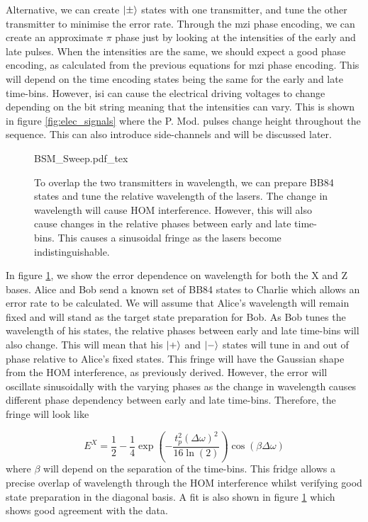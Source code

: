 Alternative, we can create $\ket{\pm}$ states with one transmitter, and tune the other transmitter to minimise the error rate. Through the \ac{mzi} phase encoding, we can create an approximate $\pi$ phase just by looking at the intensities of the early and late pulses. When the intensities are the same, we should expect a good phase encoding, as calculated from the previous equations for \ac{mzi} phase encoding. This will depend on the time encoding states being the same for the early and late time-bins. However, \ac{isi} can cause the electrical driving voltages to change depending on the bit string meaning that the intensities can vary. This is shown in figure \ref{fig:elec_signals} where the P. Mod. pulses change height throughout the sequence. This can also introduce side-channels and will be discussed later.

\begin{figure}[t]
	\centering
	\small
	\def\svgwidth{0.9\textwidth} 
	{BSM_Sweep.pdf_tex}
	\caption[Bell-state projection error against laser current]{To overlap the two transmitters in wavelength, we can prepare BB84 states and tune the relative wavelength of the lasers. The change in wavelength will cause \ac{HOM} interference. However, this will also cause changes in the relative phases between early and late time-bins. This causes a sinusoidal fringe as the lasers become indistinguishable.}
	\label{fig:wavelength_cal}
\end{figure}

In figure \ref{fig:wavelength_cal}, we show the error dependence on wavelength for both the X and Z bases. Alice and Bob send a known set of BB84 states to Charlie which allows an error rate to be calculated. We will assume that Alice's wavelength will remain fixed and will stand as the target state preparation for Bob. As Bob tunes the wavelength of his states, the relative phases between early and late time-bins will also change. This will mean that his $\ket{+}$ and $\ket{-}$ states will tune in and out of phase relative to Alice's fixed states. This fringe will have the Gaussian shape from the \ac{HOM} interference, as previously derived. However, the error will oscillate sinusoidally with the varying phases as the change in wavelength causes different phase dependency between early and late time-bins. Therefore, the fringe will look like

\begin{equation}
	E^X = \frac{1}{2} - \frac{1}{4} \exp\left(-\frac{t_p^2(\Delta\omega)^2}{16\ln(2)}\right) \cos(\beta\Delta\omega)
\end{equation}
where $\beta$ will depend on the separation of the time-bins. This fridge allows a precise overlap of wavelength through the \ac{HOM} interference whilst verifying good state preparation in the diagonal basis. A fit is also shown in figure \ref{fig:wavelength_cal} which shows good agreement with the data. 

